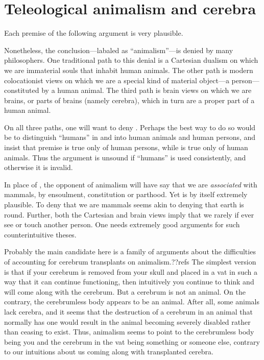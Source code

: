 \section{Teleological animalism and cerebra}
Each premise of the following argument is very plausible.

Nonetheless, the conclusion---labaled as ``animalism''---is denied by many philosophers. One traditional path to 
this denial is a Cartesian dualism on which we are immaterial souls that inhabit human animals. The other path 
is modern colocationist views on which we are a special kind of material object---a person---constituted by a human 
animal. The third path is brain views on which we are brains, or parts of brains (namely cerebra), which in turn are a 
proper part of a human animal. 

On all three paths, one will want to deny . Perhaps the best way to do so would be to distinguish ``humans'' 
in  and  into  human animals and human persons, and insist that premise  is true 
only of human persons, while  is true only of human animals. Thus the argument is unsound if ``humans'' is used 
consistently, and otherwise it is invalid. 

In place of , the opponent of animalism will have say that we are 
\textit{associated} with mammals, by ensoulment, constitution or parthood.   Yet  is by itself extremely plausible. 
To deny that we are mammals seems akin to denying that earth
is round. Further, both the Cartesian and brain views imply that we
rarely if ever see or touch another person. One needs extremely good arguments for such counterintuitive theses. 

Probably the main candidate here is a family of arguments about the difficulties of accounting for cerebrum transplants
on animalism.??refs The simplest version is that if your cerebrum is removed from your skull and placed in a vat in such a way
that it can continue functioning, then intuitively you continue to think and will come along with the cerebrum. But a cerebrum
is not an animal. On the contrary, the cerebrumless body appears to be an animal. After all, some animals lack
cerebra, and it seems that the destruction of a cerebrum in an animal that normally has one would result in the animal 
becoming severely disabled rather than ceasing to exist. Thus, animalism seems to point to the cerebrumless body being you and 
the cerebrum in the vat being something or someone else, contrary to our intuitions about us coming along with 
transplanted cerebra.

